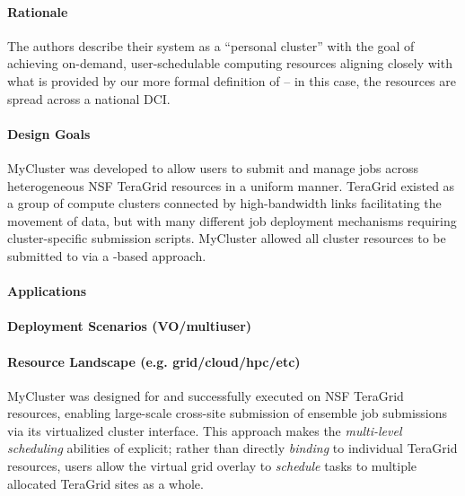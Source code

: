 \documentclass{sig-alternate}
\begin{document}
\paragraph{Rationale}
The authors describe their system
as a ``personal cluster'' with the goal of achieving on-demand,
user-schedulable computing resources aligning closely with what is
provided by our more formal definition of \pilotjobs -- in this case,
the resources are spread across a national DCI.

\paragraph{Design Goals}
MyCluster was developed to allow users to submit and manage
jobs across heterogeneous NSF TeraGrid resources in a uniform
manner.  TeraGrid existed as a group of compute clusters
connected by high-bandwidth links facilitating the movement
of data, but with many different job deployment mechanisms
requiring cluster-specific submission scripts.  MyCluster
allowed all cluster resources to be submitted to via a
\pilotjob-based approach.

\paragraph{Applications}

\paragraph{Deployment Scenarios (VO/multiuser)}

\paragraph{Resource Landscape (e.g. grid/cloud/hpc/etc)}
MyCluster was designed for and successfully executed on NSF TeraGrid
resources, enabling large-scale cross-site submission of ensemble
job submissions via its virtualized cluster interface.  
This approach makes the \textit{multi-level scheduling} abilities
of \pilotjobs explicit; rather than directly \textit{binding}
to individual TeraGrid resources, users allow the virtual grid
overlay to \textit{schedule} tasks to multiple allocated TeraGrid sites
as a whole.
\end{document}
